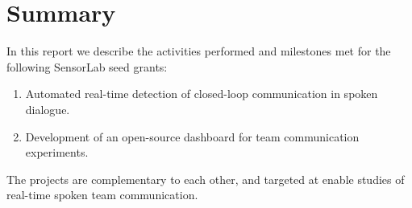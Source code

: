 \chapter{Summary}

In this report we describe the activities performed and milestones met for the
following SensorLab seed grants:

\begin{enumerate}
    \item Automated real-time detection of closed-loop communication in spoken
        dialogue.
    \item Development of an open-source dashboard for team communication
        experiments.
\end{enumerate}

The projects are complementary to each other, and targeted at enable studies of
real-time spoken team communication.
